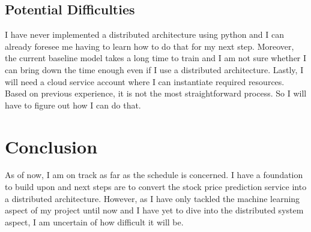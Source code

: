 \documentclass{report}
\def\backmatter{%
    \setcounter{section}{0}
    \renewcommand{\thesection}{\Alph{section}}
}%
\begin{document}
\section{Potential Difficulties}
I have never implemented a distributed architecture using python and I can already foresee me having to learn how to do that for my next step. Moreover, the current baseline model takes a long time to train and I am not sure whether I can bring down the time enough even if I use a distributed architecture. Lastly, I will need a cloud service account where I can instantiate required resources. Based on previous experience, it is not the most straightforward process. So I will have to figure out how I can do that.

\chapter{Conclusion}\label{chap:conclusion}
As of now, I am on track as far as the schedule is concerned. I have a foundation to build upon and next steps are to convert the stock price prediction service into a distributed architecture. However, as I have only tackled the machine learning aspect of my project until now and I have yet to dive into the distributed system aspect, I am uncertain of how difficult it will be. 

\backmatter

\printbibliography
\end{document}
